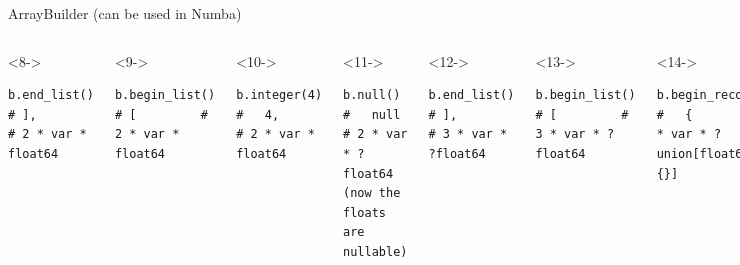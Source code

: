 \documentclass[aspectratio=169]{beamer}
\begin{document}
\begin{frame}[fragile]{ArrayBuilder (can be used in Numba)}
\begin{columns}
\vspace{-0.43 cm}
\begin{uncoverenv}<8->
\begin{verbatim}
b.end_list()      # ],        # 2 * var * float64
\end{verbatim}
\end{uncoverenv}
\vspace{-0.43 cm}
\begin{uncoverenv}<9->
\begin{verbatim}
b.begin_list()    # [         # 2 * var * float64
\end{verbatim}
\end{uncoverenv}
\vspace{-0.43 cm}
\begin{uncoverenv}<10->
\begin{verbatim}
b.integer(4)      #   4,      # 2 * var * float64
\end{verbatim}
\end{uncoverenv}
\vspace{-0.43 cm}
\begin{uncoverenv}<11->
\begin{verbatim}
b.null()          #   null    # 2 * var * ?float64    (now the floats are nullable)
\end{verbatim}
\end{uncoverenv}
\vspace{-0.43 cm}
\begin{uncoverenv}<12->
\begin{verbatim}
b.end_list()      # ],        # 3 * var * ?float64
\end{verbatim}
\end{uncoverenv}
\vspace{-0.43 cm}
\begin{uncoverenv}<13->
\begin{verbatim}
b.begin_list()    # [         # 3 * var * ?float64
\end{verbatim}
\end{uncoverenv}
\vspace{-0.43 cm}
\begin{uncoverenv}<14->
\begin{verbatim}
b.begin_record()  #   {       # 3 * var * ?union[float64, {}]
\end{verbatim}
\end{uncoverenv}
\vspace{-0.43 cm}
\begin{uncoverenv}<15->
\begin{verbatim}

\end{verbatim}
\end{uncoverenv}
\end{columns}
\end{frame}
\end{document}

